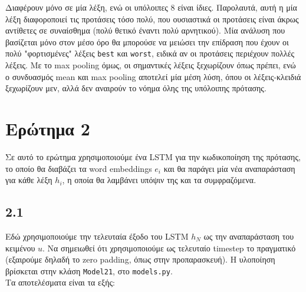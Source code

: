 \documentclass[a4paper, 12pt]{article}
\begin{document}
        Διαφέρουν μόνο σε μία λέξη, ενώ οι υπόλοιπες 8 είναι ίδιες. Παρολαυτά, αυτή η μία λέξη διαφοροποιεί τις προτάσεις τόσο πολύ, που ουσιαστικά οι προτάσεις είναι άκρως αντίθετες σε συναίσθημα (πολύ θετικό έναντι πολύ αρνητικού). Μία ανάλυση που βασίζεται μόνο στον μέσο όρο θα μπορούσε να μειώσει την επίδραση που έχουν οι πολύ "φορτισμένες" λέξεις \verb|best| και \verb|worst|, ειδικά αν οι προτάσεις περιέχουν πολλές λέξεις. Με το max pooling όμως, οι σημαντικές λέξεις ξεχωρίζουν όπως πρέπει, ενώ ο συνδυασμός mean και max pooling αποτελεί μία μέση λύση, όπου οι λέξεις-κλειδιά ξεχωρίζουν μεν, αλλά δεν αναιρούν το νόημα όλης της υπόλοιπης πρότασης.
    
\section*{Ερώτημα 2}

    Σε αυτό το ερώτημα χρησιμοποιούμε ένα LSTM για την κωδικοποίηση της πρότασης, το οποίο θα διαβάζει τα word embeddings $e_i$ και θα παράγει μία νέα αναπαράσταση για κάθε λέξη $h_i$, η οποία θα λαμβάνει υπόψιν της και τα συμφραζόμενα.
    
    \subsection*{2.1}

        Εδώ χρησιμοποιούμε την τελευταία έξοδο του LSTM $h_N$ ως την αναπαράσταση του κειμένου $u$. Να σημειωθεί ότι χρησιμοποιούμε ως τελευταίο timestep το πραγματικό (εξαιρούμε δηλαδή το zero padding, όπως στην προπαρασκευή). Η υλοποίηση βρίσκεται στην κλάση \verb|Model21|, στο \verb|models.py|. \\
        
        Τα αποτελέσματα είναι τα εξής:
        
\end{document}
